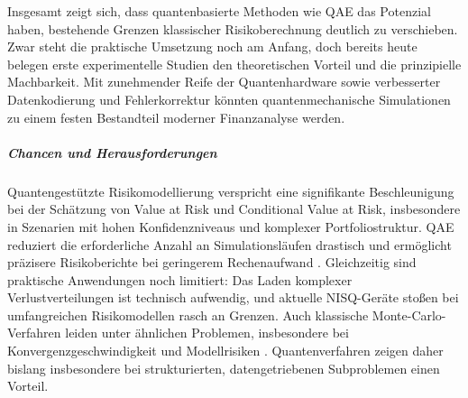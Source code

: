 Insgesamt zeigt sich, dass quantenbasierte Methoden wie QAE das Potenzial haben, bestehende Grenzen klassischer Risikoberechnung deutlich zu verschieben. Zwar steht die praktische Umsetzung noch am Anfang, doch bereits heute belegen erste experimentelle Studien den theoretischen Vorteil und die prinzipielle Machbarkeit. Mit zunehmender Reife der Quantenhardware sowie verbesserter Datenkodierung und Fehlerkorrektur könnten quantenmechanische Simulationen zu einem festen Bestandteil moderner Finanzanalyse werden.

\subparagraph{Chancen und Herausforderungen}

Quantengestützte Risikomodellierung verspricht eine signifikante Beschleunigung bei der Schätzung von Value at Risk und Conditional Value at Risk, insbesondere in Szenarien mit hohen Konfidenzniveaus und komplexer Portfoliostruktur. QAE reduziert die erforderliche Anzahl an Simulationsläufen drastisch und ermöglicht präzisere Risikoberichte bei geringerem Rechenaufwand \cite[S. 6–7]{orus_quantum_2019}. Gleichzeitig sind praktische Anwendungen noch limitiert: Das Laden komplexer Verlustverteilungen ist technisch aufwendig, und aktuelle NISQ-Geräte stoßen bei umfangreichen Risikomodellen rasch an Grenzen. Auch klassische Monte-Carlo-Verfahren leiden unter ähnlichen Problemen, insbesondere bei Konvergenzgeschwindigkeit und Modellrisiken \cite[S. 1–2]{MonteCarloSim2023}. Quantenverfahren zeigen daher bislang insbesondere bei strukturierten, datengetriebenen Subproblemen einen Vorteil.

